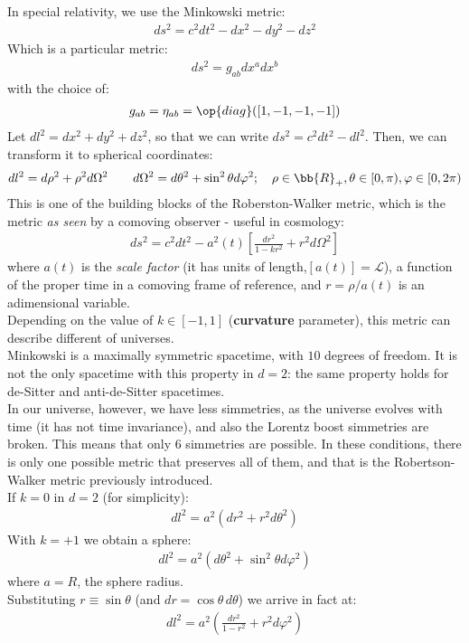\documentclass[../PhysUniverse.tex]{subfiles}
\begin{document}
In special relativity, we use the Minkowski metric:
\begin{align*}
ds^2 = c^2 dt^2 -dx^2 - dy^2 -dz^2
\end{align*}
Which is a particular metric:
\begin{align*}
ds^2 = g_{ab} dx^a dx^b
\end{align*}
with the choice of:
\begin{align*}
g_{ab} =\eta_{ab} = \op{diag}([1,-1,-1,-1])
\end{align*}
Let $dl^2 = dx^2 + dy^2 + dz^2$, so that we can write $ds^2 = c^2dt^2 -dl^2$. Then, we can transform it to spherical coordinates:
\begin{align*}
dl^2 = d\rho^2 + \rho^2 d\Omega^2 \qquad d\Omega^2 = d\theta^2 + \sin^2\theta d\varphi^2; \quad \rho \in \bb{R}_+, \theta \in [0,\pi), \varphi \in [0,2\pi)
\end{align*}
This is one of the building blocks of the Roberston-Walker metric, which is the metric \textit{as seen} by a comoving observer - useful in cosmology:
\begin{align*}
ds^2 = c^2 dt^2 - a^2(t) \left[\frac{dr^2}{1-kr^2}+r^2d\Omega^2\right]
\end{align*}
where $a(t)$ is the \textit{scale factor} (it has units of length,$[a(t)] = \mathscr{L}$), a function of the proper time in a comoving frame of reference, and $r=\rho/a(t)$ is an adimensional variable.\\
Depending on the value of $k \in [-1,1]$ (\textbf{curvature} parameter), this metric can describe different  of universes.\\

Minkowski is a maximally symmetric spacetime, with $10$ degrees of freedom. It is not the only spacetime with this property in $d=2$: the same property holds for de-Sitter and anti-de-Sitter spacetimes.\\

In our universe, however, we have less simmetries, as the universe evolves with time (it has not time invariance), and also the Lorentz boost simmetries are broken. This means that only $6$ simmetries are possible. In these conditions, there is only one possible metric that preserves all of them, and that is the Robertson-Walker metric previously introduced.\\

If $k=0$ in $d=2$ (for simplicity):
\begin{align*}
dl^2 = a^2(dr^2 + r^2 d\theta^2)
\end{align*}
With $k=+1$ we obtain a sphere:
\begin{align*}
dl^2 = a^2(d\theta^2 + \sin^2\theta d\varphi^2)
\end{align*}
where $a=R$, the sphere radius.\\
Substituting $r\equiv \sin\theta$ (and $dr =\cos\theta \,d\theta$) we arrive in fact at:
\begin{align*}
dl^2 = a^2 \left(\frac{dr^2}{1-r^2} + r^2 d\varphi^2\right)
\end{align*}
\end{document}
